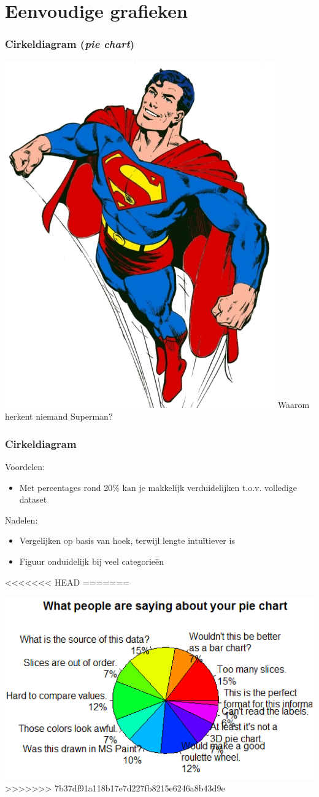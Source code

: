 \documentclass{beamer}
\begin{document}
\begin{frame}[plain]

\end{frame}

\section{Eenvoudige grafieken}
\sectionframelogo{}

\begin{frame}
  \frametitle{Cirkeldiagram (\emph{pie chart})}

  \centering
  \includegraphics[width=.8cm]{img/les2-hero-3}
  Waarom herkent niemand Superman?

\end{frame}

\begin{frame}
  \frametitle{Cirkeldiagram}

  Voordelen:
  \begin{itemize}
    \item Met percentages rond 20\% kan je makkelijk verduidelijken t.o.v. volledige dataset
  \end{itemize}
  Nadelen:
  \begin{itemize}
    \item Vergelijken op basis van hoek, terwijl lengte intuïtiever is
    \item Figuur onduidelijk bij veel categorieën
  \end{itemize}

  \begin{center}
<<<<<<< HEAD
=======

  \includegraphics[width=.6\textwidth]{img/pie-chart.png}
>>>>>>> 7b37df91a118b17e7d227fb8215e6246a8b43d9e
  \end{center}

\end{frame}
\end{document}
